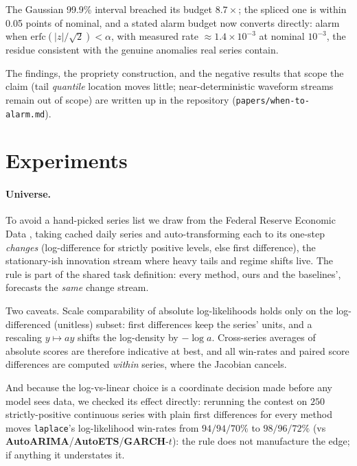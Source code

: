 \documentclass[article]{jss}
\providecommand{\pkg}[1]{\textbf{#1}}
\providecommand{\code}[1]{\texttt{#1}}
\begin{document}
The Gaussian 99.9\% interval breached its budget $8.7\times$; the spliced
one is within 0.05 points of nominal, and a stated alarm budget now
converts directly: alarm when $\mathrm{erfc}(|z|/\sqrt{2}) < \alpha$, with
measured rate ${\approx}1.4\times10^{-3}$ at nominal $10^{-3}$, the residue
consistent with the genuine anomalies real series contain.

The findings, the propriety construction, and the negative results that
scope the claim (tail \emph{quantile} location moves little;
near-deterministic waveform streams remain out of scope) are written up in
the repository (\code{papers/when-to-alarm.md}).

\section{Experiments} \label{sec:experiments}

\paragraph{Universe.}
To avoid a hand-picked series list we draw from the Federal Reserve Economic Data
\citep{fred}, taking cached daily series and auto-transforming each to its
one-step \emph{changes} (log-difference for strictly positive levels, else first
difference), the stationary-ish innovation stream where heavy tails and regime
shifts live. The rule is part of the shared task definition: every method, ours
and the baselines', forecasts the \emph{same} change stream.

Two caveats. Scale
comparability of absolute log-likelihoods holds only on the log-differenced
(unitless) subset: first differences keep the series' units, and a rescaling
$y \mapsto ay$ shifts the log-density by $-\log a$. Cross-series averages
of absolute scores are therefore indicative at best, and all win-rates and paired score
differences are computed \emph{within} series, where the Jacobian cancels.

And because the log-vs-linear choice is a coordinate decision made before any
model sees data, we checked its effect directly: rerunning the contest on $250$
strictly-positive continuous series with plain first differences for every
method moves \code{laplace}'s log-likelihood win-rates from $94/94/70\%$ to
$98/96/72\%$ (vs \pkg{AutoARIMA}/\pkg{AutoETS}/\pkg{GARCH}-$t$): the rule
does not manufacture the edge; if anything it understates it.
\end{document}
